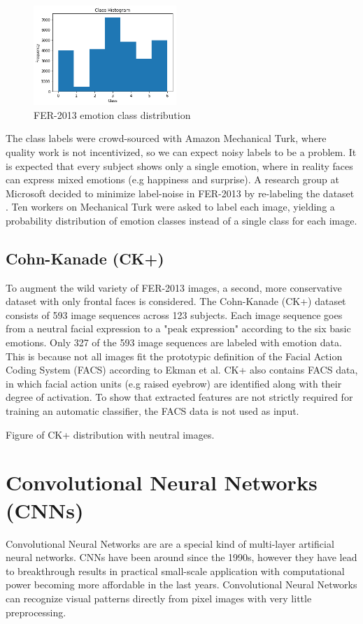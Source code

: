 \documentclass[twoside]{article}
\begin{document}
\begin{multicols}{2}
\begin{figure}[H]
	\includegraphics[width=0.48\textwidth]{class_dist}
	\caption{FER-2013 emotion class distribution}
\end{figure}

The class labels were crowd-sourced with Amazon Mechanical Turk, where quality work is not incentivized, so we can expect noisy labels to be a problem. It is expected that every subject shows only a single emotion, where in reality faces can express mixed emotions (e.g happiness and surprise). A research group at Microsoft decided to minimize label-noise in FER-2013 by re-labeling the dataset \cite{barsoum16}. Ten workers on Mechanical Turk were asked to label each image, yielding a probability distribution of emotion classes instead of a single class for each image.


\subsection{Cohn-Kanade (CK+)}
To augment the wild variety of FER-2013 images, a second, more conservative dataset with only frontal faces is considered. The Cohn-Kanade (CK+) dataset consists of 593 image sequences across 123 subjects. Each image sequence goes from a neutral facial expression to a "peak expression" according to the six basic emotions. Only 327 of the 593 image sequences are labeled with emotion data. This is because not all images fit the prototypic definition of the Facial Action Coding System (FACS) according to Ekman et al. CK+ also contains FACS data, in which facial action units (e.g raised eyebrow) are identified along with their degree of activation. To show that extracted features are not strictly required for training an automatic classifier, the FACS data is not used as input.

Figure of CK+ distribution with neutral images.


\section{Convolutional Neural Networks (CNNs)}
Convolutional Neural Networks are are a special kind of multi-layer artificial neural networks. CNNs have been around since the 1990s, however they have lead to breakthrough results in practical small-scale application with computational power becoming more affordable in the last years. Convolutional Neural Networks can recognize visual patterns directly from pixel images with very little preprocessing. 


\end{multicols}
\end{document}
